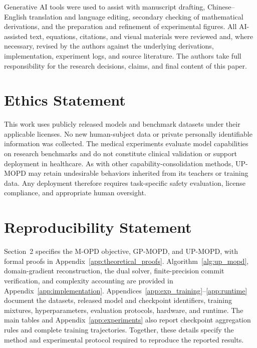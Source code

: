\documentclass{article}
\begin{document}
Generative AI tools were used to assist with manuscript drafting,
Chinese--English translation and language editing, secondary checking of
mathematical derivations, and the preparation and refinement of experimental
figures. All AI-assisted text, equations, citations, and visual materials were
reviewed and, where necessary, revised by the authors against the underlying
derivations, implementation, experiment logs, and source literature. The
authors take full responsibility for the research decisions, claims, and final
content of this paper.

\section*{Ethics Statement}

This work uses publicly released models and benchmark datasets under their
applicable licenses. No new human-subject data or private personally
identifiable information was collected. The medical experiments evaluate model
capabilities on research benchmarks and do not constitute clinical validation
or support deployment in healthcare. As with other capability-consolidation
methods, UP-MOPD may retain undesirable behaviors inherited from its teachers
or training data. Any deployment therefore requires task-specific safety
evaluation, license compliance, and appropriate human oversight.

\section*{Reproducibility Statement}

Section~2 specifies the M-OPD objective, GP-MOPD, and UP-MOPD, with formal
proofs in Appendix~\ref{app:theoretical_proofs}. Algorithm~\ref{alg:up_mopd}, domain-gradient
reconstruction, the dual solver, finite-precision commit verification, and
complexity accounting are provided in Appendix~\ref{app:implementation}.
Appendices~\ref{app:exp_training}--\ref{app:runtime} document the datasets,
released model and checkpoint identifiers, training mixtures, hyperparameters,
evaluation protocols, hardware, and runtime. The main tables and Appendix~\ref{app:experiments}
also report checkpoint aggregation rules and complete training trajectories.
Together, these details specify the method and experimental protocol required
to reproduce the reported results.
\end{document}
